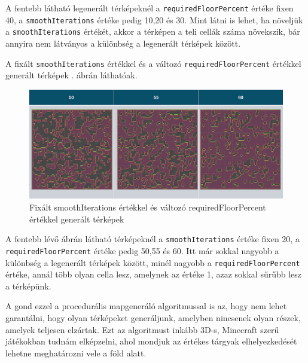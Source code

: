 A fentebb látható legenerált térképeknél a \texttt{requiredFloorPercent} értéke fixen 40, a \texttt{smoothIterations} értéke pedig 10,20 és 30. Mint látni is lehet, ha növeljük a \texttt{smoothIterations} értékét, akkor a térképen a teli cellák száma növekszik, bár annyira nem látványos a különbség a legenerált térképek között. 

A fixált \texttt{smoothIterations} értékkel és a változó \texttt{requiredFloorPercent} értékkel generált térképek . ábrán láthatóak.

\begin{figure}[ht]
\centering
\includegraphics[width=\textwidth]{images/fixedsmoothcellular.png}
\caption{Fixált smoothIterations értékkel és változó requiredFloorPercent értékkel generált térképek}
\label{fig:fixedSmoothCellular}
\end{figure}

\newpage
A fentebb lévő ábrán látható térképeknél a \texttt{smoothIterations} értéke fixen 20, a \texttt{requiredFloorPercent} értéke pedig 50,55 és 60. Itt már sokkal nagyobb a különbség a legenerált térképek között, minél nagyobb a \texttt{requiredFloorPercent} értéke, annál több olyan cella lesz, amelynek az értéke 1, azaz sokkal sűrűbb lesz a térképünk.

A gond ezzel a procedurális mapgeneráló algoritmussal is az, hogy nem lehet garantálni, hogy olyan térképeket generáljunk, amelyben nincsenek olyan részek, amelyek teljesen elzártak. Ezt az algoritmust inkább 3D-s, Minecraft szerű játékokban tudnám elképzelni, ahol mondjuk az értékes tárgyak elhelyezkedését lehetne meghatározni vele a föld alatt.


